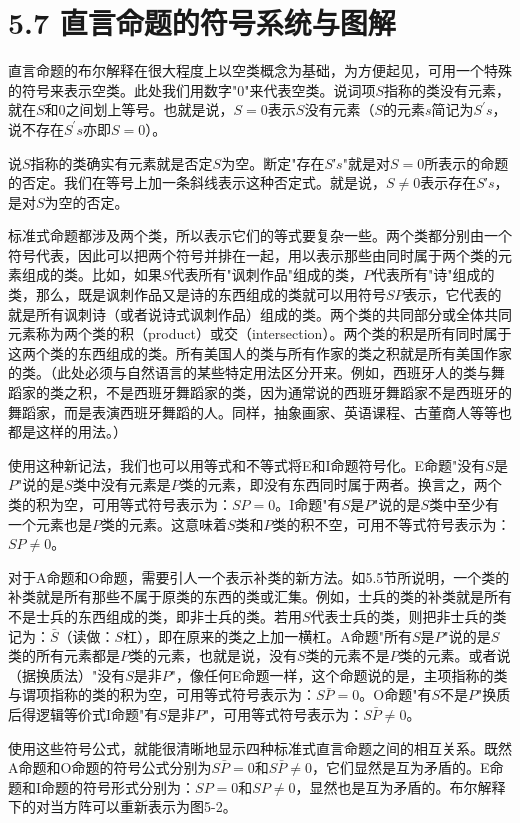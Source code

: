 \section*{5.7 直言命题的符号系统与图解}
直言命题的布尔解释在很大程度上以空类概念为基础，为方便起见，可用一个特殊的符号来表示空类。此处我们用数字"0"来代表空类。说词项$S$指称的类没有元素，就在$S$和0之间划上等号。也就是说，$S=0$表示$S$没有元素（$S$的元素$s$简记为$S^{\prime}s$，说不存在$S^{\prime}s$亦即$S=0$）。

说$S$指称的类确实有元素就是否定$S$为空。断定"存在$S$′$s$"就是对$S=0$所表示的命题的否定。我们在等号上加一条斜线表示这种否定式。就是说，$S \neq 0$表示存在$S$′$s$，是对$S$为空的否定。

标准式命题都涉及两个类，所以表示它们的等式要复杂一些。两个类都分别由一个符号代表，因此可以把两个符号并排在一起，用以表示那些由同时属于两个类的元素组成的类。比如，如果$S$代表所有"讽刺作品"组成的类，$P$代表所有"诗"组成的类，那么，既是讽刺作品又是诗的东西组成的类就可以用符号$SP$表示，它代表的就是所有讽刺诗（或者说诗式讽刺作品）组成的类。两个类的共同部分或全体共同元素称为两个类的积（product）或交（intersection）。两个类的积是所有同时属于这两个类的东西组成的类。所有美国人的类与所有作家的类之积就是所有美国作家的类。（此处必须与自然语言的某些特定用法区分开来。例如，西班牙人的类与舞蹈家的类之积，不是西班牙舞蹈家的类，因为通常说的西班牙舞蹈家不是西班牙的舞蹈家，而是表演西班牙舞蹈的人。同样，抽象画家、英语课程、古董商人等等也都是这样的用法。）

使用这种新记法，我们也可以用等式和不等式将E和I命题符号化。E命题"没有$S$是$P$"说的是$S$类中没有元素是$P$类的元素，即没有东西同时属于两者。换言之，两个类的积为空，可用等式符号表示为：$SP=0$。I命题"有$S$是$P$"说的是$S$类中至少有一个元素也是$P$类的元素。这意味着$S$类和$P$类的积不空，可用不等式符号表示为：$SP \neq 0$。

对于A命题和O命题，需要引人一个表示补类的新方法。如5.5节所说明，一个类的补类就是所有那些不属于原类的东西的类或汇集。例如，士兵的类的补类就是所有不是士兵的东西组成的类，即非士兵的类。若用$S$代表士兵的类，则把非士兵的类记为：$\bar{S}$（读做：$S$杠），即在原来的类之上加一横杠。A命题"所有$S$是$P$"说的是$S$类的所有元素都是$P$类的元素，也就是说，没有$S$类的元素不是$P$类的元素。或者说（据换质法）"没有$S$是非$P$"，像任何E命题一样，这个命题说的是，主项指称的类与谓项指称的类的积为空，可用等式符号表示为：$S\bar{P}=0$。O命题"有$S$不是$P$"换质后得逻辑等价式I命题"有$S$是非$P$"，可用等式符号表示为：$S\bar{P} \neq 0$。

使用这些符号公式，就能很清晰地显示四种标准式直言命题之间的相互关系。既然A命题和O命题的符号公式分别为$S\bar{P}=0$和$S\bar{P} \neq 0$，它们显然是互为矛盾的。E命题和I命题的符号形式分别为：$SP=0$和$SP \neq 0$，显然也是互为矛盾的。布尔解释下的对当方阵可以重新表示为图5-2。

